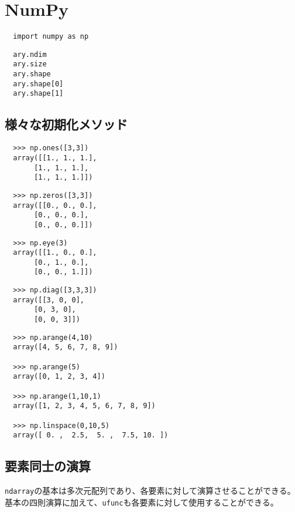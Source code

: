 
\chapter{NumPy}

\begin{verbatim}
  import numpy as np
\end{verbatim}

\begin{verbatim}
  ary.ndim     
  ary.size
  ary.shape
  ary.shape[0]
  ary.shape[1]
\end{verbatim}


\section{様々な初期化メソッド}

\begin{verbatim}
  >>> np.ones([3,3])
  array([[1., 1., 1.],
       [1., 1., 1.],
       [1., 1., 1.]])
\end{verbatim}


\begin{verbatim}
  >>> np.zeros([3,3])
  array([[0., 0., 0.],
       [0., 0., 0.],
       [0., 0., 0.]])
\end{verbatim}

\begin{verbatim}
  >>> np.eye(3)
  array([[1., 0., 0.],
       [0., 1., 0.],
       [0., 0., 1.]])
\end{verbatim}

\begin{verbatim}
  >>> np.diag([3,3,3])
  array([[3, 0, 0],
       [0, 3, 0],
       [0, 0, 3]])
\end{verbatim}

\begin{verbatim}
  >>> np.arange(4,10)
  array([4, 5, 6, 7, 8, 9])

  >>> np.arange(5)
  array([0, 1, 2, 3, 4])

  >>> np.arange(1,10,1)
  array([1, 2, 3, 4, 5, 6, 7, 8, 9])

  >>> np.linspace(0,10,5)
  array([ 0. ,  2.5,  5. ,  7.5, 10. ])
\end{verbatim}


\section{要素同士の演算}
{\tt ndarray}の基本は多次元配列であり、各要素に対して演算させることができる。
基本の四則演算に加えて、{\tt ufunc}も各要素に対して使用することができる。


